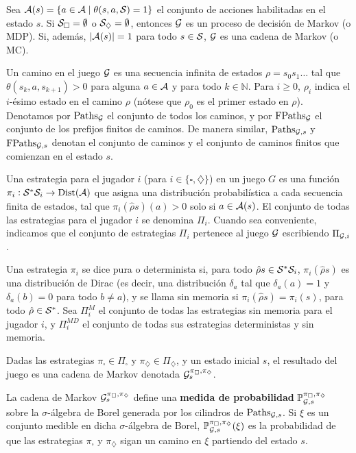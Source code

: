Sea \( \mathcal{A}(s) = \{ a \in \mathcal{A} \mid \theta(s, a, \mathcal{S}) = 1 \} \) el conjunto de
acciones habilitadas en el estado \( s \). Si \( \mathcal{S}_\square = \emptyset \) o
\( \mathcal{S}_\diamondsuit = \emptyset \), entonces \( \mathcal{G} \) es un proceso de decisión
de Markov (o MDP). Si, además, \( |\mathcal{A}(s)| = 1 \) para todo \( s \in \mathcal{S} \),
\( \mathcal{G} \) es una cadena de Markov (o MC).

Un camino en el juego \( \mathcal{G} \) es una secuencia infinita de estados \( \rho =
s_0 s_1 \dots \) tal que \( \theta(s_k, a, s_{k+1}) > 0 \) para alguna \( a \in
\mathcal{A} \) y para todo \( k \in \mathbb{N} \). Para \( i \geq 0 \), \( \rho_i \)
indica el \( i \)-ésimo estado en el camino \( \rho \) (nótese que \( \rho_0 \)
es el primer estado en \( \rho \)). Denotamos por \( \text{Paths}_{\mathcal{G}} \) el
conjunto de todos los caminos, y por \( \text{FPaths}_{\mathcal{G}} \) el conjunto de los
prefijos finitos de caminos. De manera similar, \( \text{Paths}_{\mathcal{G},s} \) y \(
\text{FPaths}_{\mathcal{G},s} \) denotan el conjunto de caminos y el conjunto de caminos
finitos que comienzan en el estado \( s \).

Una estrategia para el jugador \( i \) (para \( i \in \{\square, \diamondsuit\}
\)) en un juego \( G \) es una función \( \pi_i : \mathcal{S}^\ast \mathcal{S}_i \to
\text{Dist}(\mathcal{A}) \) que asigna una distribución probabilística a cada
secuencia finita de estados, tal que \( \pi_i(\hat{\rho}s)(a) > 0 \) solo si \(
a \in \mathcal{A}(s) \). El conjunto de todas las estrategias para el jugador \( i \)
se denomina \( \Pi_i \). Cuando sea conveniente, indicamos que el conjunto de
estrategias \( \Pi_i \) pertenece al juego \( \mathcal{G} \) escribiendo \( \Pi_{\mathcal{G},i}
\).

Una estrategia \( \pi_i \) se dice pura o determinista si, para todo \(
\hat{\rho}s \in \mathcal{S}^\ast \mathcal{S}_i \), \( \pi_i(\hat{\rho}s) \) es una distribución
de Dirac (es decir, una distribución \( \delta_a \) tal que \( \delta_a(a) = 1
\) y \( \delta_a(b) = 0 \) para todo \( b \neq a \)), y se llama sin memoria si
\( \pi_i(\hat{\rho}s) = \pi_i(s) \), para todo \( \hat{\rho} \in \mathcal{S}^\ast \).
Sea \( \Pi^M_i \) el conjunto de todas las estrategias sin memoria para el
jugador \( i \), y \( \Pi^{MD}_i \) el conjunto de todas sus estrategias
deterministas y sin memoria.

Dadas las estrategias \( \pi_\square \in \Pi_\square \) y \( \pi_\diamondsuit
\in \Pi_\diamondsuit \), y un estado inicial \( s \), el resultado del juego es
una cadena de Markov denotada \( \mathcal{G}^{\pi_\square, \pi_\diamondsuit}_s \).

La cadena de Markov \( \mathcal{G}^{\pi_\square, \pi_\diamondsuit}_s \) define
una\textbf{ medida de probabilidad} \( \mathbb{P}^{\pi_\square,
	\pi_\diamondsuit}_{\mathcal{G},s} \) sobre la \( \sigma \)-álgebra de Borel generada por
los cilindros de \( \text{Paths}_{\mathcal{G},s} \). Si \( \xi \) es un conjunto medible
en dicha \( \sigma \)-álgebra de Borel, \( \mathbb{P}^{\pi_\square,
	\pi_\diamondsuit}_{\mathcal{G},s}(\xi) \) es la probabilidad de que las estrategias \(
\pi_\square \) y \( \pi_\diamondsuit \) sigan un camino en \( \xi \) partiendo
del estado \( s \).

